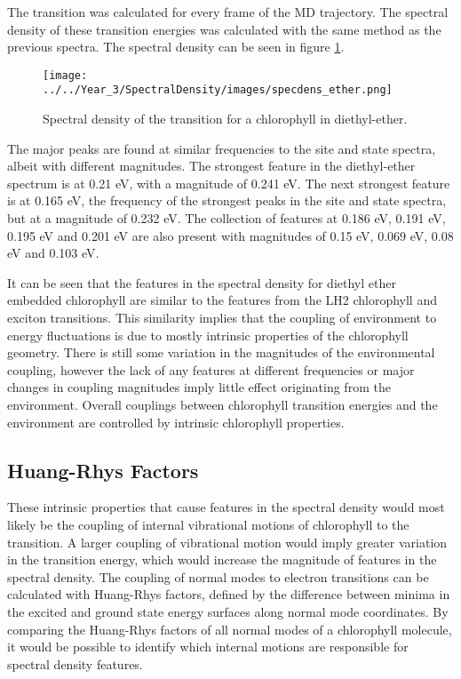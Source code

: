 The \Qy transition was calculated for every frame of the MD trajectory. The spectral
density of these transition energies was calculated with the same method as the 
previous spectra. The spectral density can be seen in figure \ref{fig:specdens_ether}.

\begin{figure}
    \centering
    \texttt{[image: ../../Year\_3/SpectralDensity/images/specdens\_ether.png]}
    \caption{Spectral density of the \Qy transition for a chlorophyll in diethyl-ether.}
    \label{fig:specdens_ether}
\end{figure}

The major peaks are found at similar frequencies to the site and state spectra, albeit
with different magnitudes. The strongest feature in the diethyl-ether spectrum is
at 0.21 eV, with a magnitude of 0.241 eV. The next strongest feature is at 0.165 
eV, the frequency of the strongest peaks in the site and state spectra, but at a
magnitude of 0.232 eV. The collection of features at 0.186 eV, 0.191 eV, 0.195 eV
and 0.201 eV are also present with magnitudes of 0.15 eV, 0.069 eV, 0.08 eV and 
0.103 eV.

It can be seen that the features in the spectral density for diethyl ether embedded
chlorophyll are similar to the features from the LH2 chlorophyll and exciton transitions.
This similarity implies that the coupling of environment to energy fluctuations 
is due to mostly intrinsic properties of the chlorophyll geometry. There is still
some variation in the magnitudes of the environmental coupling, however the lack 
of any features at different frequencies or major changes in coupling magnitudes
imply little effect originating from the environment. Overall couplings between
chlorophyll transition energies and the environment are controlled by intrinsic 
chlorophyll properties.

\subsection{Huang-Rhys Factors}
\label{subsec:hrf}

These intrinsic properties that cause features in the spectral density would most
likely be the coupling of internal vibrational motions of chlorophyll to the \Qy transition. 
A larger coupling of vibrational motion would imply greater variation in the \Qy 
transition energy, which would increase the magnitude of features in the spectral
density. The coupling of normal modes to electron transitions can be calculated 
with Huang-Rhys factors, defined by the difference between minima in the excited 
and ground state energy surfaces along normal mode coordinates. By comparing the 
Huang-Rhys factors of all normal modes of a chlorophyll molecule, it would be possible 
to identify which internal motions are responsible for spectral density features.


